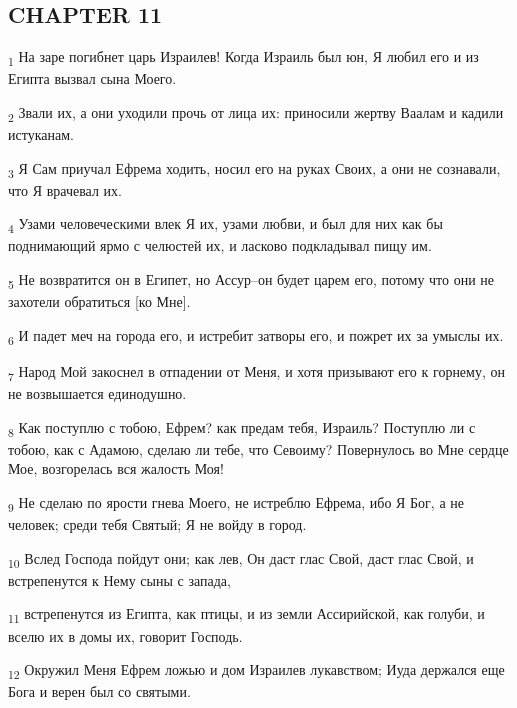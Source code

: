 \subsection{CHAPTER 11}
\begin{tcolorbox}
\textsubscript{1} На заре погибнет царь Израилев! Когда Израиль был юн, Я любил его и из Египта вызвал сына Моего.
\end{tcolorbox}
\begin{tcolorbox}
\textsubscript{2} Звали их, а они уходили прочь от лица их: приносили жертву Ваалам и кадили истуканам.
\end{tcolorbox}
\begin{tcolorbox}
\textsubscript{3} Я Сам приучал Ефрема ходить, носил его на руках Своих, а они не сознавали, что Я врачевал их.
\end{tcolorbox}
\begin{tcolorbox}
\textsubscript{4} Узами человеческими влек Я их, узами любви, и был для них как бы поднимающий ярмо с челюстей их, и ласково подкладывал пищу им.
\end{tcolorbox}
\begin{tcolorbox}
\textsubscript{5} Не возвратится он в Египет, но Ассур--он будет царем его, потому что они не захотели обратиться [ко Мне].
\end{tcolorbox}
\begin{tcolorbox}
\textsubscript{6} И падет меч на города его, и истребит затворы его, и пожрет их за умыслы их.
\end{tcolorbox}
\begin{tcolorbox}
\textsubscript{7} Народ Мой закоснел в отпадении от Меня, и хотя призывают его к горнему, он не возвышается единодушно.
\end{tcolorbox}
\begin{tcolorbox}
\textsubscript{8} Как поступлю с тобою, Ефрем? как предам тебя, Израиль? Поступлю ли с тобою, как с Адамою, сделаю ли тебе, что Севоиму? Повернулось во Мне сердце Мое, возгорелась вся жалость Моя!
\end{tcolorbox}
\begin{tcolorbox}
\textsubscript{9} Не сделаю по ярости гнева Моего, не истреблю Ефрема, ибо Я Бог, а не человек; среди тебя Святый; Я не войду в город.
\end{tcolorbox}
\begin{tcolorbox}
\textsubscript{10} Вслед Господа пойдут они; как лев, Он даст глас Свой, даст глас Свой, и встрепенутся к Нему сыны с запада,
\end{tcolorbox}
\begin{tcolorbox}
\textsubscript{11} встрепенутся из Египта, как птицы, и из земли Ассирийской, как голуби, и вселю их в домы их, говорит Господь.
\end{tcolorbox}
\begin{tcolorbox}
\textsubscript{12} Окружил Меня Ефрем ложью и дом Израилев лукавством; Иуда держался еще Бога и верен был со святыми.
\end{tcolorbox}
